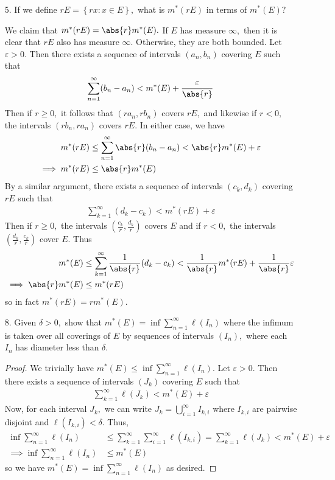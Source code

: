 \documentclass{article}
\begin{document}
\begin{itemize}
		\newpage
	\item[5.] If we define $rE=\left\{ rx:x\in E \right\},$ what is $m^*(rE)$ in terms of $m^*(E)?$
		\begin{soln}
			We claim that $m^*(rE) = \abs{r}m^*(E).$ If $E$ has measure $\infty,$ then it is clear that $rE$ also has measure $\infty.$ Otherwise, they are both bounded. Let $\varepsilon>0.$ Then there exists a sequence of intervals $(a_n, b_n)$ covering $E$ such that
			\begin{align*}
				\sum_{n=1}^{\infty} (b_n-a_n)< m^*(E) + \frac{\varepsilon}{\abs{r}}
			\end{align*}
			Then if $r\ge 0,$ it follows that $(ra_n, rb_n)$ covers $rE,$ and likewise if $r<0,$ the intervals $(rb_n, ra_n)$ covers $rE.$ In either case, we have
			\begin{align*}
				m^*(rE) &\le \sum_{n=1}^{\infty} \abs{r}(b_n-a_n) < \abs{r}m^*(E) + \varepsilon \\
				\implies m^*(rE) &\le \abs{r} m^*(E)
			\end{align*}
			By a similar argument, there exists a sequence of intervals $(c_k, d_k)$ covering $rE$ such that
			\begin{align*}
				\sum_{k=1}^{\infty} (d_k-c_k) < m^*(rE) + \varepsilon
			\end{align*}
			Then if $r\ge 0,$ the intervals $\left( \frac{c_k}{r}, \frac{d_k}{r} \right)$ covers $E$ and if $r<0,$ the intervals $\left( \frac{d_k}{r}, \frac{c_k}{r} \right)$ cover $E.$ Thus
			\begin{align*}
				m^*(E) &\le \sum_{k=1}^{\infty} \frac{1}{\abs{r}} (d_k-c_k) < \frac{1}{\abs{r}} m^*(rE) + \frac{1}{\abs{r}}\varepsilon \\
				\implies \abs{r} m^*(E) &\le m^*(rE)
			\end{align*}
			so in fact $m^*(rE) = rm^*(E).$
		\end{soln}

	\item[8.] Given $\delta>0,$ show that $m^*(E)=\inf\sum_{n=1}^{\infty} \ell(I_n)$ where the infimum is taken over all coverings of $E$ by sequences of intervals $(I_n),$ where each $I_n$ has diameter less than $\delta.$
		\begin{proof}
			We trivially have $m^*(E)\le \inf\sum_{n=1}^{\infty} \ell(I_n).$ Let $\varepsilon>0.$ Then there exists a sequence of intervals $(J_k)$ covering $E$ such that
			\begin{align*}
				\sum_{k=1}^{\infty} \ell(J_k)<m^*(E)+\varepsilon
			\end{align*}
			Now, for each interval $J_k,$ we can write $J_k = \bigcup_{i=1}^\infty I_{k, i}$ where $I_{k, i}$ are pairwise disjoint and $\ell(I_{k, i})<\delta.$ Thus,
			\begin{align*}
				\inf\sum_{n=1}^{\infty} \ell(I_n) &\le \sum_{k=1}^{\infty} \sum_{i=1}^{\infty} \ell(I_{k, i}) = \sum_{k=1}^{\infty} \ell(J_k) < m^*(E) + \varepsilon \\
				\implies \inf\sum_{n=1}^{\infty} \ell(I_n) &\le m^*(E)
			\end{align*}
			so we have $m^*(E)=\inf \sum_{n=1}^{\infty} \ell(I_n)$ as desired.
		\end{proof}


\end{itemize}
\end{document}
